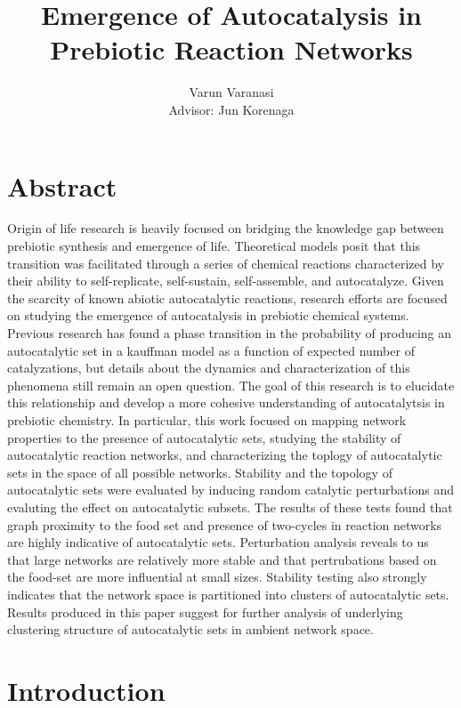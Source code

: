 \documentclass[11pt]{article}
\title{Emergence of Autocatalysis in Prebiotic Reaction Networks }
\author{Varun Varanasi \\{Advisor: Jun Korenaga}}
\begin{document}
\maketitle
\newpage

\tableofcontents

\newpage

\section{Abstract}

Origin of life research is heavily focused on bridging the knowledge gap between prebiotic synthesis and emergence of life. 
Theoretical models posit that this transition was facilitated through a series of chemical reactions characterized by their ability to self-replicate, self-sustain, self-assemble, and autocatalyze.
Given the scarcity of known abiotic autocatalytic reactions, research efforts are focused on studying the emergence of autocatalysis in prebiotic chemical systems. 
Previous research has found a phase transition in the probability of producing an autocatalytic set in a kauffman model as a function of expected number of catalyzations, but details about the dynamics and characterization of this phenomena still remain an open question.
The goal of this research is to elucidate this relationship and develop a more cohesive understanding of autocatalytsis in prebiotic chemistry.
In particular, this work focused on mapping network properties to the presence of autocatalytic sets, studying the stability of autocatalytic reaction networks, and characterizing the toplogy of autocatalytic sets in the space of all possible networks.
Stability and the topology of autocatalytic sets were evaluated by inducing random catalytic perturbations and evaluting the effect on autocatalytic subsets.
The results of these tests found that graph proximity to the food set and presence of two-cycles in reaction networks are highly indicative of autocatalytic sets.
Perturbation analysis reveals to us that large networks are relatively more stable and that pertrubations based on the food-set are more influential at small sizes.
Stability testing also strongly indicates that the network space is partitioned into clusters of autocatalytic sets.
Results produced in this paper suggest for further analysis of underlying clustering structure of autocatalytic sets in ambient network space.

\newpage

\section{Introduction}
\end{document}
